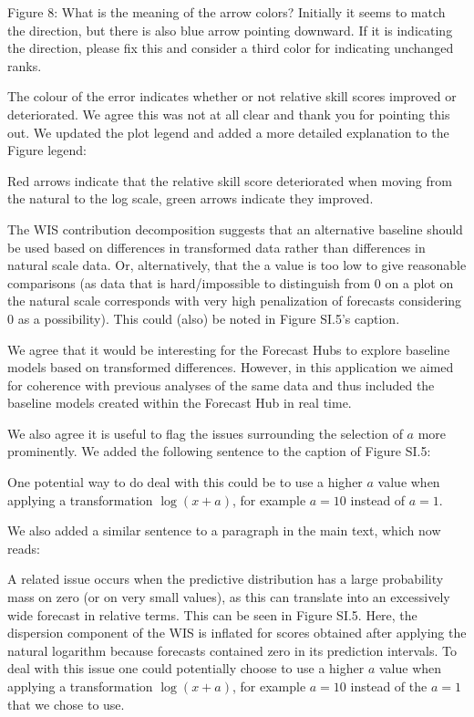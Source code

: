 \documentclass{article}
\newcommand{\black}{\color{black}}
\newcommand{\blue}{\color{blue}}
\newcommand{\indented}{\setlength{\leftskip}{1cm}}
\newcommand{\notindented}{\setlength{\leftskip}{0cm}}
\begin{document}
\notindented

\blue
Figure 8: What is the meaning of the arrow colors? Initially it seems to match the direction, but there is also blue arrow pointing downward. If it is indicating the direction, please fix this and consider a third color for indicating unchanged ranks.

\black
The colour of the error indicates whether or not relative skill scores improved or deteriorated. We agree this was not at all clear and thank you for pointing this out. We updated the plot legend and added a more detailed explanation to the Figure legend: 

\indented
Red arrows indicate that the relative skill score deteriorated when moving from the natural to the log scale, green arrows indicate they improved.

\notindented

\blue
The WIS contribution decomposition suggests that an alternative baseline should be used based on differences in transformed data rather than differences in natural scale data. Or, alternatively, that the a value is too low to give reasonable comparisons (as data that is hard/impossible to distinguish from 0 on a plot on the natural scale corresponds with very high penalization of forecasts considering 0 as a possibility). This could (also) be noted in Figure SI.5’s caption.

\black
We agree that it would be interesting for the Forecast Hubs to explore baseline models based on transformed differences. However, in this application we aimed for coherence with previous analyses of the same data and thus included the baseline models created within the Forecast Hub in real time.

We also agree it is useful to flag the issues surrounding the selection of $a$ more prominently. We added the following sentence to the caption of Figure SI.5: 

\indented
One potential way to do deal with this could be to use a higher $a$ value when applying a transformation $\log(x + a)$, for example $a = 10$ instead of $a = 1$.

\notindented

We also added a similar sentence to a paragraph in the main text, which now reads: 

\indented

A related issue occurs when the predictive distribution has a large probability mass on zero (or on very small values), as this can translate into an excessively wide forecast in relative terms. This can be seen in Figure SI.5. Here, the dispersion component of the WIS is inflated for scores obtained after applying the natural logarithm because forecasts contained zero in its prediction intervals. To deal with this issue one could potentially choose to use a higher $a$ value when applying a transformation $\log(x + a)$, for example $a = 10$ instead of the $a = 1$ that we chose to use.
\end{document}
